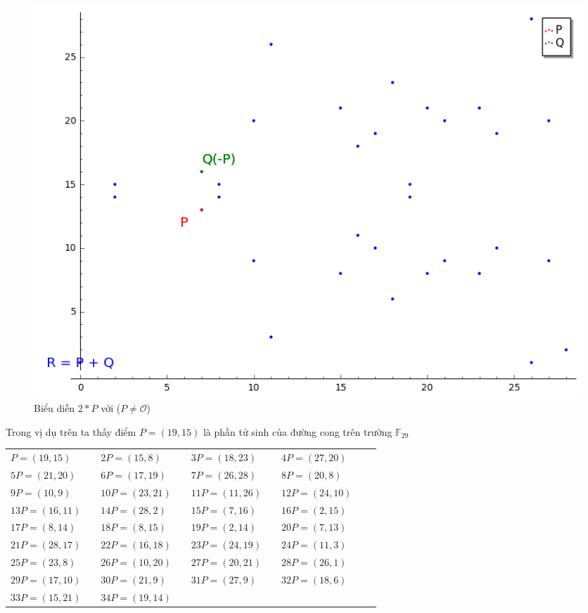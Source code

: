 \documentclass[a4paper,12pt]{report}
\begin{document}
\begin{center}
\begin{figure}[H]
\includegraphics[width=0.8\linewidth]{../im15.png}
\caption{Biểu diễn $2*P$ với ($P \neq \mathcal{O}$)}  \label{h19-1}
\end{figure}
\end{center}
Trong vị dụ trên ta thấy điểm $P = (19, 15)$ là phần tử sinh  của đường cong trên trường $\mathbb{F}_{29}$
\begin{center}
\begin{tabular}{lllllllll}
$P = (19, 15)$ & & $2P = (15, 8)$ & & $3P = (18, 23)$ & & $4P = (27, 20)$ \\
$5P = (21, 20)$ & & $6P = (17, 19)$ & & $7P = (26, 28)$ & & $8P = (20, 8)$ \\
$9P = (10, 9)$ & & $10P = (23, 21)$ & & $11P = (11, 26)$ & & $12P = (24, 10)$ \\
$13P = (16, 11)$ & & $14P = (28, 2)$ & & $15P = (7, 16)$ & & $16P = (2, 15)$ \\
$17P = (8, 14)$ & & $18P = (8, 15)$ & & $19P = (2, 14)$ & & $20P = (7, 13)$ \\
$21P = (28, 17)$ & & $22P = (16, 18)$ & & $23P = (24, 19)$ & & $24P = (11, 3)$ \\
$25P = (23, 8)$ & & $26P = (10, 20)$ & & $27P = (20, 21)$ & & $28P = (26, 1)$ \\
$29P = (17, 10)$ & & $30P = (21, 9)$ & & $31P = (27, 9)$ & & $32P = (18, 6)$ \\
$33P = (15, 21)$ & & $34P = (19, 14)$  \\
\end{tabular}
\end{center}
\end{document}
